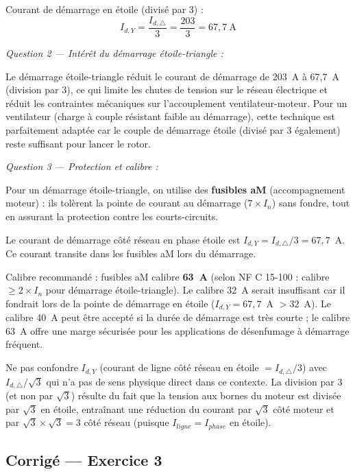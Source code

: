 Courant de démarrage en étoile (divisé par 3) :
\[
  I_{d,Y} = \frac{I_{d,\triangle}}{3} = \frac{203}{3} = \boxed{67{,}7~\text{A}}
\]

\textit{Question 2 — Intérêt du démarrage étoile-triangle :}

Le démarrage étoile-triangle réduit le courant de démarrage de 203~A à 67,7~A (division par 3), ce qui limite les chutes de tension sur le réseau électrique et réduit les contraintes mécaniques sur l'accouplement ventilateur-moteur. Pour un ventilateur (charge à couple résistant faible au démarrage), cette technique est parfaitement adaptée car le couple de démarrage étoile (divisé par 3 également) reste suffisant pour lancer le rotor.

\textit{Question 3 — Protection et calibre :}

\begin{methode}
Pour un démarrage étoile-triangle, on utilise des \textbf{fusibles aM} (accompagnement moteur) : ils tolèrent la pointe de courant au démarrage ($7 \times I_n$) sans fondre, tout en assurant la protection contre les courts-circuits.

Le courant de démarrage côté réseau en phase étoile est $I_{d,Y} = I_{d,\triangle}/3 = 67{,}7$~A. Ce courant transite dans les fusibles aM lors du démarrage.

Calibre recommandé : fusibles aM calibre \textbf{63~A} (selon NF C 15-100 : calibre $\geq 2 \times I_n$ pour démarrage étoile-triangle). Le calibre 32~A serait insuffisant car il fondrait lors de la pointe de démarrage en étoile ($I_{d,Y} = 67{,}7$~A $> 32$~A). Le calibre 40~A peut être accepté si la durée de démarrage est très courte ; le calibre 63~A offre une marge sécurisée pour les applications de désenfumage à démarrage fréquent.

\begin{attention}
Ne pas confondre $I_{d,Y}$ (courant de ligne côté réseau en étoile $= I_{d,\triangle}/3$) avec $I_{d,\triangle}/\sqrt{3}$ qui n'a pas de sens physique direct dans ce contexte. La division par 3 (et non par $\sqrt{3}$) résulte du fait que la tension aux bornes du moteur est divisée par $\sqrt{3}$ en étoile, entraînant une réduction du courant par $\sqrt{3}$ côté moteur et par $\sqrt{3} \times \sqrt{3} = 3$ côté réseau (puisque $I_{ligne} = I_{phase}$ en étoile).
\end{attention}
\end{methode}

\subsection*{Corrigé — Exercice 3}

